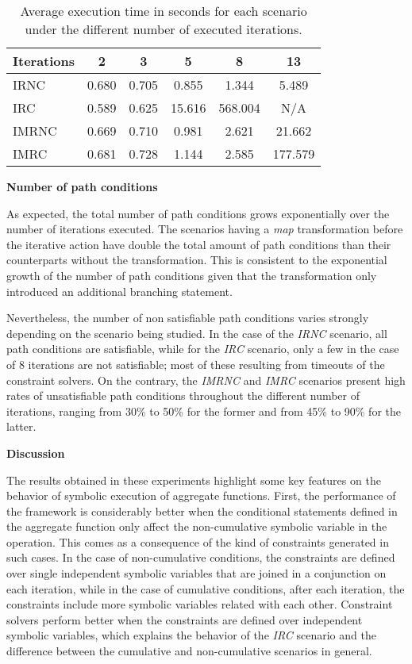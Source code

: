 \begin{table}[t]
	\centering
	\small
	\begin{tabular*}{0.9\textwidth}{@{\extracolsep{\fill}} lccccc}
		\hline
		Iterations & 2 & 3 & 5 & 8 & 13 \\
		\hline\hline
		IRNC  & 0.680 & 0.705 & 0.855  & 1.344   & 5.489   \\
		IRC   & 0.589 & 0.625 & 15.616 & 568.004 & N/A      \\
		IMRNC & 0.669 & 0.710 & 0.981  & 2.621   & 21.662  \\
		IMRC  & 0.681 & 0.728 & 1.144  & 2.585    & 177.579 \\
		\hline	
	\end{tabular*}	
	\caption[Average Execution Times]{Average execution time in seconds for each scenario under the different number of executed iterations.}
	\label{tab:evaluation:quantitative-time}
\end{table}

\textbf{Number of path conditions}

As expected, the total number of path conditions grows exponentially over the number of iterations executed. The scenarios having a \textit{map} transformation before the iterative action have double the total amount of path conditions than their counterparts without the transformation. This is consistent to the exponential growth of the number of path conditions given that the transformation only introduced an additional branching statement.

Nevertheless, the number of non satisfiable path conditions varies strongly depending on the scenario being studied. In the case of the \textit{IRNC} scenario, all path conditions are satisfiable, while for the \textit{IRC} scenario, only a few in the case of 8 iterations are not satisfiable; most of these resulting from timeouts of the constraint solvers. On the contrary, the \textit{IMRNC} and \textit{IMRC} scenarios present high rates of unsatisfiable path conditions throughout the different number of iterations, ranging from 30\% to 50\% for the former and from 45\% to 90\% for the latter.

\textbf{Discussion}

The results obtained in these experiments highlight some key features on the behavior of symbolic execution of aggregate functions. First, the performance of the framework is considerably better when the conditional statements defined in the aggregate function only affect the non-cumulative symbolic variable in the operation. This comes as a consequence of the kind of constraints generated in such cases. In the case of non-cumulative conditions, the constraints are defined over single independent symbolic variables that are joined in a conjunction on each iteration, while in the case of cumulative conditions, after each iteration, the constraints include more symbolic variables related with each other. Constraint solvers perform better when the constraints are defined over independent symbolic variables, which explains the behavior of the \textit{IRC} scenario and the difference between the cumulative and non-cumulative scenarios in general.

